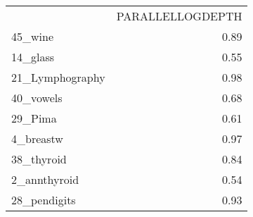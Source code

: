 \begin{tabular}{lr}
 & PARALLELLOGDEPTH \\
45_wine & 0.89 \\
14_glass & 0.55 \\
21_Lymphography & 0.98 \\
40_vowels & 0.68 \\
29_Pima & 0.61 \\
4_breastw & 0.97 \\
38_thyroid & 0.84 \\
2_annthyroid & 0.54 \\
28_pendigits & 0.93 \\
\end{tabular}
